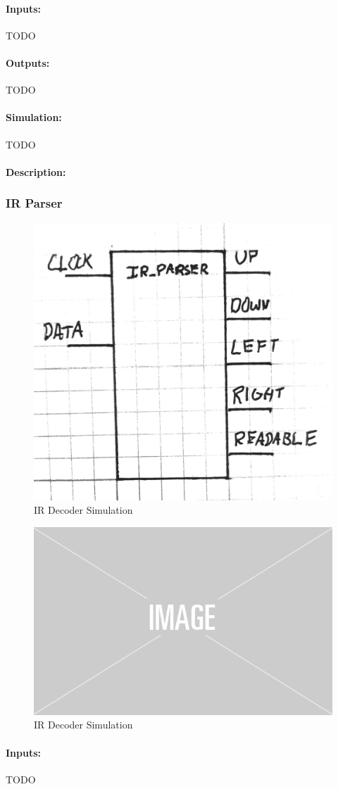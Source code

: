 \documentclass[]{article}
\begin{document}
\paragraph{Inputs:} TODO
\paragraph{Outputs:} TODO
\paragraph{Simulation:} TODO
\paragraph{Description:}


\subsubsection{IR Parser}
\begin{figure}[H]\centering
    \includegraphics[width=0.5\linewidth]{figures/IR_Parser_Block.jpg}
    \caption{IR Decoder Simulation}
    \label{fig:irParserBlock}
\end{figure}
\begin{figure}[H]\centering
    \includegraphics[width=0.5\linewidth]{figures/placeholder.png}
    \caption{IR Decoder Simulation}
    \label{fig:irParserSim}
\end{figure}
\paragraph{Inputs:} TODO
\end{document}
